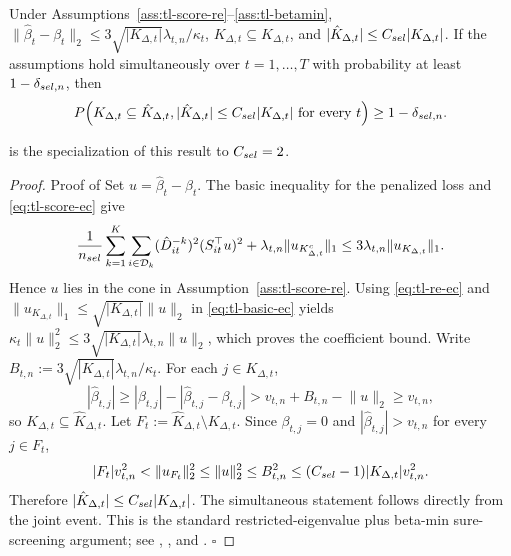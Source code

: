 \documentclass[opre,nonblindrev]{informs4}
\newenvironment{revision}{\begingroup\color{revisionblue}\ignorespaces}{\endgroup}
\newcommand{\norm}[1]{\lVert#1\rVert}
\renewcommand{\qed}{\unskip\nobreak\hfill\ensuremath{\square}}
\begin{document}
\begin{revision}
\begin{proposition}\label{prop:tl-support-ec}
Under Assumptions~\ref{ass:tl-score-re}--\ref{ass:tl-betamin},
$\norm{\hat\beta_t-\beta_t}_2\le3\sqrt{\lvert K_{\Delta,t}\rvert}\lambda_{t,n}/\kappa_t$,
$K_{\Delta,t}\subseteq\hat K_{\Delta,t}$, and
$|\hat K_{\Delta,t}|\le C_{\rm sel}|K_{\Delta,t}|$.
If the assumptions hold simultaneously over $t=1,\ldots,T$ with probability at least $1-\delta_{\rm sel,n}$, then
\[
P\!\left(
K_{\Delta,t}\subseteq\hat K_{\Delta,t},
|\hat K_{\Delta,t}|\le C_{\rm sel}|K_{\Delta,t}|
\text{  for every }t
\right)
\ge1-\delta_{\rm sel,n}.
\]
\end{proposition}

 is the specialization of this result to
$C_{\rm sel}=2$.

\begin{proof}{Proof of }
Set $u=\hat\beta_t-\beta_t$. The basic inequality for the penalized loss and \eqref{eq:tl-score-ec} give
\begin{equation}
\frac{1}{n_{\rm sel}}
\sum_{k=1}^K\sum_{i\in\mathcal D_k}
(\hat D_{it}^{-k})^2(S_{it}^\top u)^2
+
\lambda_{t,n}\norm{u_{K_{\Delta,t}^c}}_1
\le
3\lambda_{t,n}\norm{u_{K_{\Delta,t}}}_1.
\label{eq:tl-basic-ec}
\end{equation}
Hence $u$ lies in the cone in Assumption~\ref{ass:tl-score-re}. Using \eqref{eq:tl-re-ec} and $\norm{u_{K_{\Delta,t}}}_1\le\sqrt{\lvert K_{\Delta,t}\rvert}\norm{u}_2$ in \eqref{eq:tl-basic-ec} yields
$\kappa_t\norm{u}_2^2\le3\sqrt{\lvert K_{\Delta,t}\rvert}\lambda_{t,n}\norm{u}_2$,
which proves the coefficient bound. Write
$B_{t,n}:=3\sqrt{|K_{\Delta,t}|}\lambda_{t,n}/\kappa_t$. For each
$j\in K_{\Delta,t}$,
\[
|\hat\beta_{t,j}|
\ge
|\beta_{t,j}|-|\hat\beta_{t,j}-\beta_{t,j}|
>
v_{t,n}+B_{t,n}-\norm{u}_2
\ge v_{t,n},
\]
so $K_{\Delta,t}\subseteq\hat K_{\Delta,t}$. Let
$F_t:=\hat K_{\Delta,t}\setminus K_{\Delta,t}$. Since $\beta_{t,j}=0$
and $|\hat\beta_{t,j}|>v_{t,n}$ for every $j\in F_t$,
\[
|F_t|v_{t,n}^2
<
\norm{u_{F_t}}_2^2
\le
\norm{u}_2^2
\le
B_{t,n}^2
\le
(C_{\rm sel}-1)|K_{\Delta,t}|v_{t,n}^2.
\]
Therefore $|\hat K_{\Delta,t}|\le C_{\rm sel}|K_{\Delta,t}|$. The
simultaneous statement follows directly from the joint event. This is the
standard restricted-eigenvalue plus beta-min sure-screening argument; see
\citet{bickel2009simultaneous},
\citet{zhou2009thresholding,zhou2010thresholded}, and
\citet{van2011adaptive}. \qed
\end{proof}


\end{revision}
\end{document}
